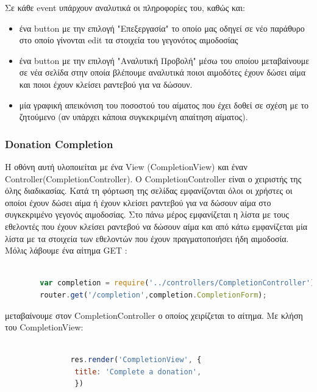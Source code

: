 		Σε κάθε event υπάρχουν αναλυτικά οι πληροφορίες του, καθώς και:
		
		\begin{itemize}
		\item ένα button με την επιλογή "Επεξεργασία" το οποίο μας οδηγεί σε νέο παράθυρο στο οποίο γίνονται edit τα στοιχεία του γεγονότος αιμοδοσίας
		
		\item ένα button με την επιλογή "Αναλυτική Προβολή" μέσω του οποίου μεταβαίνουμε σε νέα σελίδα στην οποία βλέπουμε αναλυτικά ποιοι αιμοδότες έχουν δώσει αίμα και ποιοι έχουν κλείσει ραντεβού για να δώσουν.
		
		\item μία γραφική απεικόνιση του ποσοστού του αίματος που έχει δοθεί σε σχέση με το ζητούμενο (αν υπάρχει κάποια συγκεκριμένη απαίτηση αίματος).
		
		\end{itemize}


	
	
				\subsubsection{Donation Completion}
		
	Η οθόνη αυτή υλοποιείται με ένα View (CompletionView) και έναν Controller(CompletionController). O CompletionController είναι ο χειριστής της όλης διαδικασίας. Κατά τη φόρτωση της σελίδας εμφανίζονται όλοι οι χρήστες οι οποίοι έχουν δώσει αίμα ή έχουν κλείσει ραντεβού για να δώσουν αίμα στο συγκεκριμένο γεγονός αιμοδοσίας. Στο πάνω μέρος εμφανίζεται η λίστα με τους εθελοντές που έχουν κλείσει ραντεβού να δώσουν αίμα και από κάτω εμφανίζεται μία λίστα με τα στοιχεία των εθελοντών που έχουν πραγματοποιήσει ήδη αιμοδοσία. Μόλις λάβουμε ένα αίτημα GET :
		
		\begin{lstlisting}[language=Javascript]			
		
		var completion = require('../controllers/CompletionController');
		router.get('/completion',completion.CompletionForm);  


		\end{lstlisting}
		
μεταβαίνουμε στον CompletionController ο οποίος χειρίζεται το αίτημα. Με κλήση του CompletionView:


		\begin{lstlisting}[language=Javascript]			

			   res.render('CompletionView', { 
                title: 'Complete a donation',
				})
				
		\end{lstlisting}
		
